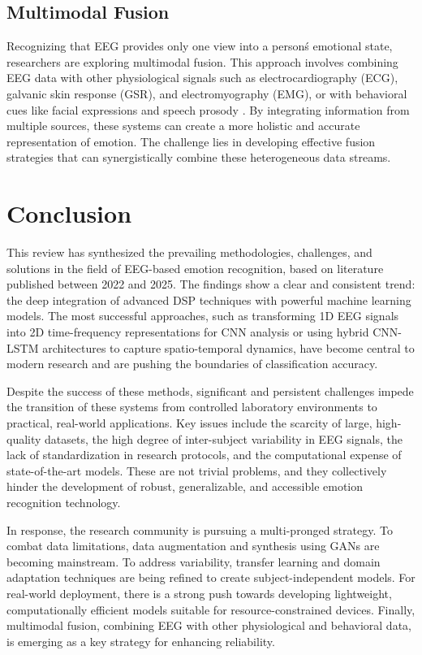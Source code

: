 \documentclass[conference]{IEEEtran}
\begin{document}
\subsection*{Multimodal Fusion}
Recognizing that EEG provides only one view into a person\'s emotional state, researchers are exploring multimodal fusion. This approach involves combining EEG data with other physiological signals such as electrocardiography (ECG), galvanic skin response (GSR), and electromyography (EMG), or with behavioral cues like facial expressions and speech prosody \cite{b6, b8}. By integrating information from multiple sources, these systems can create a more holistic and accurate representation of emotion. The challenge lies in developing effective fusion strategies that can synergistically combine these heterogeneous data streams.

\section{Conclusion}
This review has synthesized the prevailing methodologies, challenges, and solutions in the field of EEG-based emotion recognition, based on literature published between 2022 and 2025. The findings show a clear and consistent trend: the deep integration of advanced DSP techniques with powerful machine learning models. The most successful approaches, such as transforming 1D EEG signals into 2D time-frequency representations for CNN analysis or using hybrid CNN-LSTM architectures to capture spatio-temporal dynamics, have become central to modern research and are pushing the boundaries of classification accuracy.

Despite the success of these methods, significant and persistent challenges impede the transition of these systems from controlled laboratory environments to practical, real-world applications. Key issues include the scarcity of large, high-quality datasets, the high degree of inter-subject variability in EEG signals, the lack of standardization in research protocols, and the computational expense of state-of-the-art models. These are not trivial problems, and they collectively hinder the development of robust, generalizable, and accessible emotion recognition technology.

In response, the research community is pursuing a multi-pronged strategy. To combat data limitations, data augmentation and synthesis using GANs are becoming mainstream. To address variability, transfer learning and domain adaptation techniques are being refined to create subject-independent models. For real-world deployment, there is a strong push towards developing lightweight, computationally efficient models suitable for resource-constrained devices. Finally, multimodal fusion, combining EEG with other physiological and behavioral data, is emerging as a key strategy for enhancing reliability.
\end{document}
